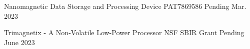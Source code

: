 




\begin{cvhonors}


\cvhonor
{Nanomagnetic Data Storage and Processing Device} %
{PAT7869586} %
{Pending} %
{Mar. 2023} %


\end{cvhonors}




\begin{cvhonors}


\cvhonor
{Trimagnetix - A Non-Volatile Low-Power Processor} %
{NSF SBIR Grant} %
{Pending} %
{June 2023} %


\end{cvhonors}
